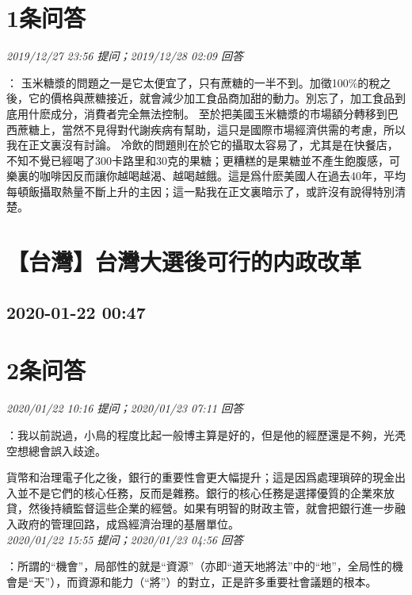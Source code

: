 \documentclass[twocolumn]{ctexart}
\begin{document}
\section{1条问答}

\textit{\hfill\noindent\small 2019/12/27 23:56 提问；2019/12/28 02:09 回答}

：
玉米糖漿的問題之一是它太便宜了，只有蔗糖的一半不到。加徵100\%的稅之後，它的價格與蔗糖接近，就會減少加工食品商加甜的動力。別忘了，加工食品到底用什麽成分，消費者完全無法控制。 
至於把美國玉米糖漿的市場額分轉移到巴西蔗糖上，當然不見得對代謝疾病有幫助，這只是國際市場經濟供需的考慮，所以我在正文裏沒有討論。 
冷飲的問題則在於它的攝取太容易了，尤其是在快餐店，不知不覺已經喝了300卡路里和30克的果糖；更糟糕的是果糖並不產生飽腹感，可樂裏的咖啡因反而讓你越喝越渴、越喝越餓。這是爲什麽美國人在過去40年，平均每頓飯攝取熱量不斷上升的主因；這一點我在正文裏暗示了，或許沒有說得特別清楚。
\\


\section{【台灣】台灣大選後可行的内政改革}
\subsection{2020-01-22 00:47}


\section{2条问答}

\textit{\hfill\noindent\small 2020/01/22 10:16 提问；2020/01/23 07:11 回答}

：我以前説過，小鳥的程度比起一般博主算是好的，但是他的經歷還是不夠，光凴空想總會誤入歧途。

貨幣和治理電子化之後，銀行的重要性會更大幅提升；這是因爲處理瑣碎的現金出入並不是它們的核心任務，反而是雜務。銀行的核心任務是選擇優質的企業來放貸，然後持續監督這些企業的經營。如果有明智的財政主管，就會把銀行進一步融入政府的管理回路，成爲經濟治理的基層單位。
\\

\textit{\hfill\noindent\small 2020/01/22 15:55 提问；2020/01/23 04:56 回答}

：所謂的“機會”，局部性的就是“資源”（亦即“道天地將法”中的“地”，全局性的機會是“天”），而資源和能力（“將”）的對立，正是許多重要社會議題的根本。
\end{document}
